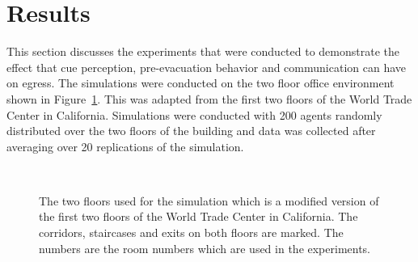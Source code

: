 





\section{Results}
\label{PreEvac:Results}

This section discusses the experiments that were conducted to demonstrate the effect that cue perception, pre-evacuation behavior and communication can have on egress. The simulations were conducted on the two floor office environment shown in Figure~\ref{fig:layout}. This was adapted from the first two floors of the World Trade Center in California.  Simulations were conducted with 200 agents randomly distributed over the two floors of the building and data was collected after averaging over 20 replications of the simulation.

\begin{figure}[!tbp]
\centering
{}
\\
\caption[The Environment Layout]{The two floors used for the simulation which is a modified version of the first two floors of the World Trade Center in California. The corridors, staircases and exits on both floors are marked. The numbers are the room numbers which are used in the experiments.}
\label{fig:layout}
\end{figure}


